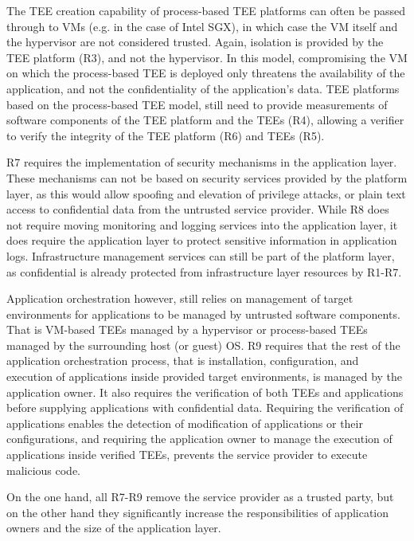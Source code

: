 The TEE creation capability of process-based TEE platforms can often be passed
through to VMs (e.g. in the case of Intel SGX), in which case the VM itself and
the hypervisor are not considered trusted. Again, isolation is provided by the
TEE platform (R3), and not the hypervisor. In this model, compromising the VM on
which the process-based TEE is deployed only threatens the availability of the
application, and not the confidentiality of the application's data. TEE
platforms based on the process-based TEE model, still need to provide
measurements of software components of the TEE platform and the TEEs (R4),
allowing a verifier to verify the integrity of the TEE platform (R6) and TEEs
(R5).

R7 requires the implementation of security mechanisms in the application layer.
These mechanisms can not be based on security services provided by the platform
layer, as this would allow spoofing and elevation of privilege attacks, or plain
text access to confidential data from the untrusted service provider. While R8
does not require moving monitoring and logging services into the application
layer, it does require the application layer to protect sensitive information in
application logs. Infrastructure management services can still be part of the
platform layer, as confidential is already protected from infrastructure layer
resources by R1-R7.

Application orchestration however, still relies on management of target
environments for applications to be managed by untrusted software components.
That is VM-based TEEs managed by a hypervisor or process-based TEEs managed by
the surrounding host (or guest) OS. R9 requires that the rest of the application
orchestration process, that is installation, configuration, and execution of
applications inside provided target environments, is managed by the application
owner. It also requires the verification of both TEEs and applications before
supplying applications with confidential data. Requiring the verification of
applications enables the detection of modification of applications or their
configurations, and requiring the application owner to manage the execution of
applications inside verified TEEs, prevents the service provider to execute
malicious code.

On the one hand, all R7-R9 remove the service provider as a trusted party, but
on the other hand they significantly increase the responsibilities of
application owners and the size of the application layer.


